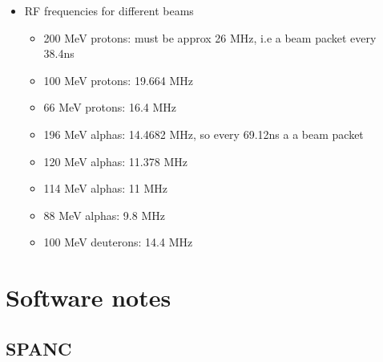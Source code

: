 \documentclass[11pt]{report}
\begin{document}
\begin{itemize}
\item RF frequencies for different beams
	\begin{itemize}
		\item	200 MeV protons: must be approx 26 MHz, i.e a beam packet every 38.4ns
		\item	100 MeV protons: 19.664 MHz
		\item   66 MeV protons: 16.4 MHz
		\item 	196 MeV alphas: 14.4682 MHz, so every 69.12ns a a beam packet
		\item   120 MeV alphas: 11.378 MHz
		\item   114 MeV alphas: 11 MHz
		\item	88 MeV alphas: 9.8 MHz
		\item	100 MeV deuterons: 14.4 MHz

	\end{itemize}
\end{itemize}



\appendix

\chapter{Software notes}\label{chap:softnotes}

\section{SPANC}
\end{document}
